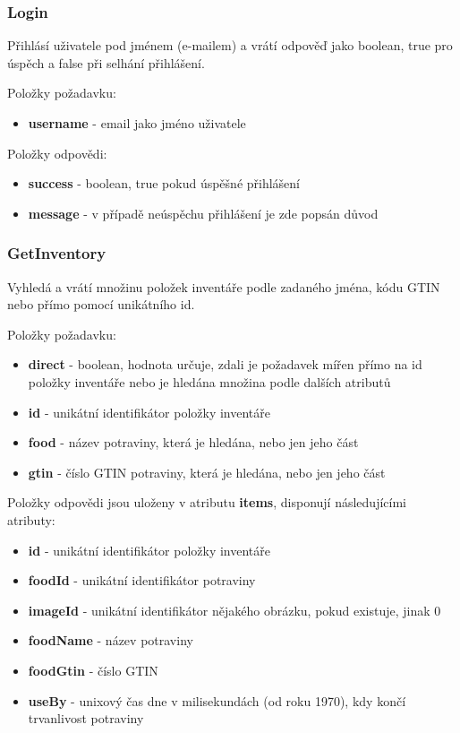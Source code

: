 \documentclass[thesis=B,czech]{FITthesis}[2013/10/20]
\begin{document}
\subsubsection{Login}
Přihlásí uživatele pod jménem (e-mailem) a vrátí odpověď jako boolean, true pro úspěch a false při selhání přihlášení.

Položky požadavku:
\begin{itemize}
  \item \textbf{username} - email jako jméno uživatele
\end{itemize}

Položky odpovědi:
\begin{itemize}
  \item \textbf{success} - boolean, true pokud úspěšné přihlášení
  \item \textbf{message} - v případě neúspěchu přihlášení je zde popsán důvod
\end{itemize}

\subsubsection{GetInventory}
Vyhledá a vrátí množinu položek inventáře podle zadaného jména, kódu GTIN nebo přímo pomocí unikátního id.

Položky požadavku:
\begin{itemize}
  \item \textbf{direct} - boolean, hodnota určuje, zdali je požadavek mířen přímo na id položky inventáře nebo je hledána množina podle dalších atributů
  \item \textbf{id} - unikátní identifikátor položky inventáře
  \item \textbf{food} - název potraviny, která je hledána, nebo jen jeho část
  \item \textbf{gtin} - číslo GTIN potraviny, která je hledána, nebo jen jeho část
\end{itemize}

Položky odpovědi jsou uloženy v atributu \textbf{items}, disponují následujícími atributy:
\begin{itemize}
  \item \textbf{id} - unikátní identifikátor položky inventáře
  \item \textbf{foodId} - unikátní identifikátor potraviny
  \item \textbf{imageId} - unikátní identifikátor nějakého obrázku, pokud existuje, jinak 0
  \item \textbf{foodName} - název potraviny
  \item \textbf{foodGtin} - číslo GTIN
  \item \textbf{useBy} - unixový čas dne v milisekundách (od roku 1970), kdy končí trvanlivost potraviny
\end{itemize}
\end{document}
